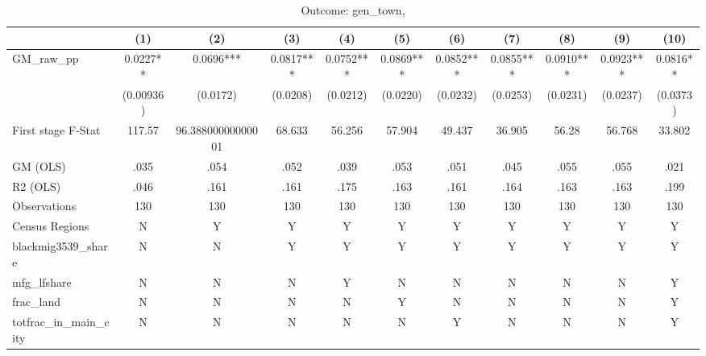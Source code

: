 \begin{table}[htbp]\centering
\def\sym#1{\ifmmode^{#1}\else\(^{#1}\)\fi}
\caption{Outcome: gen\_town, }
\begin{tabular}{l*{10}{c}}
\toprule
            &\multicolumn{1}{c}{(1)}   &\multicolumn{1}{c}{(2)}   &\multicolumn{1}{c}{(3)}   &\multicolumn{1}{c}{(4)}   &\multicolumn{1}{c}{(5)}   &\multicolumn{1}{c}{(6)}   &\multicolumn{1}{c}{(7)}   &\multicolumn{1}{c}{(8)}   &\multicolumn{1}{c}{(9)}   &\multicolumn{1}{c}{(10)}   \\
\midrule
GM\_raw\_pp   &    0.0227** &    0.0696***&    0.0817***&    0.0752***&    0.0869***&    0.0852***&    0.0855***&    0.0910***&    0.0923***&    0.0816** \\
            & (0.00936)   &  (0.0172)   &  (0.0208)   &  (0.0212)   &  (0.0220)   &  (0.0232)   &  (0.0253)   &  (0.0231)   &  (0.0237)   &  (0.0373)   \\
\midrule
First stage F-Stat&    117.57   &96.38800000000001   &    68.633   &    56.256   &    57.904   &    49.437   &    36.905   &     56.28   &    56.768   &    33.802   \\
GM (OLS)    &      .035   &      .054   &      .052   &      .039   &      .053   &      .051   &      .045   &      .055   &      .055   &      .021   \\
R2 (OLS)    &      .046   &      .161   &      .161   &      .175   &      .163   &      .161   &      .164   &      .163   &      .163   &      .199   \\
Observations&       130   &       130   &       130   &       130   &       130   &       130   &       130   &       130   &       130   &       130   \\
Census Regions&         N   &         Y   &         Y   &         Y   &         Y   &         Y   &         Y   &         Y   &         Y   &         Y   \\
blackmig3539\_share&         N   &         N   &         Y   &         Y   &         Y   &         Y   &         Y   &         Y   &         Y   &         Y   \\
mfg\_lfshare &         N   &         N   &         N   &         Y   &         N   &         N   &         N   &         N   &         N   &         Y   \\
frac\_land   &         N   &         N   &         N   &         N   &         Y   &         N   &         N   &         N   &         N   &         Y   \\
totfrac\_in\_main\_city&         N   &         N   &         N   &         N   &         N   &         Y   &         N   &         N   &         N   &         Y   \\

\end{tabular}
\end{table}
